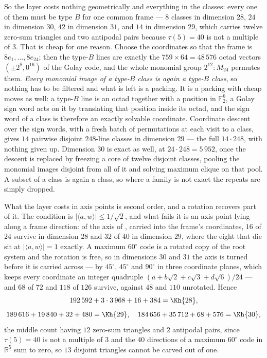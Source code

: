 \documentclass[11pt]{amsart}
\theoremstyle{remark}
\newcommand{\ip}[2]{\langle #1,#2\rangle}
\newcommand{\R}{\mathbb{R}}
\begin{document}
So the layer costs nothing geometrically and everything in the classes: every
one of them must be type $B$ for one common frame --- $8$ classes in dimension
$28$, $24$ in dimension $30$, $42$ in dimension $31$, and $14$ in dimension
$29$, which carries twelve zero-sum triangles and two antipodal pairs because
$\tau(5)=40$ is not a multiple of $3$. That is cheap for one reason. Choose the coordinates so that the frame is $8e_{1},\dots,8e_{24}$;
then the type-$B$ lines are exactly the $759\times64=48\,576$ octad vectors
$(\pm2^{8},0^{16})$ of the Golay code, and the whole monomial group
$2^{12}{:}M_{24}$ permutes them. \emph{Every monomial image of a type-$B$ class
is again a type-$B$ class}, so nothing has to be filtered and what is left is a
packing. It is a packing with cheap moves as well: a type-$B$ line is an octad
together with a position in $\mathbb{F}_{2}^{6}$, a Golay sign word acts on it by
translating that position inside its octad, and the sign word of a class is
therefore an exactly solvable coordinate. Coordinate descent over the sign
words, with a fresh batch of permutations at each visit to a class, gives $14$
pairwise disjoint $248$-line classes in dimension $29$ --- the full
$14\cdot248$, with nothing given up. Dimension $30$ is exact as well, at
$24\cdot248=5\,952$, once the descent is replaced by freezing a core of twelve
disjoint classes, pooling the monomial images disjoint from all of it and
solving maximum clique on that pool. A subset of a class is again a class, so
where a family is not exact the repeats are simply dropped.

What the layer costs in axis points is second order, and a rotation recovers
part of it. The condition is $|\ip{a}{w}|\le1/\sqrt2$, and what fails it is an
axis point lying along a frame direction: of the axis of \cite{ma-etal2025},
carried into the frame's coordinates, $16$ of $24$ survive in dimension $28$ and
$32$ of $40$ in dimension $29$, where the eight that die sit at
$|\ip{a}{w}|=1$ exactly. A maximum $60^{\circ}$ code is a rotated copy of the
root system and the rotation is free, so in dimensions $30$ and $31$ the axis is
turned before it is carried across --- by $45^{\circ}$, $45^{\circ}$ and
$90^{\circ}$ in three coordinate planes, which keeps every coordinate an integer
quadruple $(a+b\sqrt2+c\sqrt3+d\sqrt6)/24$ --- and $68$ of $72$ and $118$ of
$126$ survive, against $48$ and $110$ unrotated. Hence
\[
  192\,592+3\cdot3\,968+16+384=\Kh{28},
\]
\[
  189\,616+19\,840+32+480=\Kh{29},\quad
  184\,656+35\,712+68+576=\Kh{30} ,
\]
the middle count having $12$ zero-sum triangles and $2$ antipodal pairs, since
$\tau(5)=40$ is not a multiple of $3$ and the $40$ directions of a maximum
$60^{\circ}$ code in $\R^{5}$ sum to zero, so $13$ disjoint triangles cannot be
carved out of one.
\end{document}
